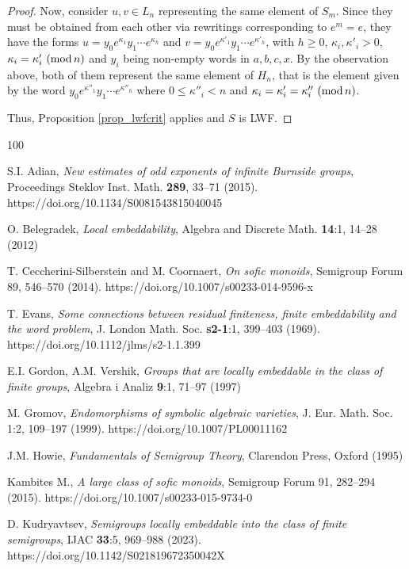 \documentclass{article}
\theoremstyle{definition}
\def\mod{{\rm mod}\,}
\begin{document}
\begin{proof}
Now, consider $u,v \in L_n$ representing the same element of $S_m$. Since they must be obtained from each other via rewritings corresponding to $e^m = e$, they have the forms $u = y_0 e^{\kappa_1} y_1 \cdots e^{\kappa_h}$ and $v = y_0 e^{\kappa'_1} y_1 \cdots e^{\kappa'_h}$, with $h \ge 0$, $\kappa_i, \kappa'_i >0$, $\kappa_i = \kappa'_i \ (\mod n)$ and $y_i$ being non-empty words in $a,b,c,x$. By the observation above, both of them represent the same element of $H_n$, that is the element given by the word $y_0 e^{\kappa''_1} y_1 \cdots e^{\kappa''_h}$ where $0 \le \kappa''_i <n$ and $\kappa_i = \kappa'_i = \kappa''_i \ (\mod n)$.

Thus, Proposition \ref{prop_lwfcrit} applies and $S$ is LWF.
\end{proof}

\begin{thebibliography}{100}

 S.I. Adian, {\em New estimates of odd exponents of infinite Burnside groups}, Proceedings Steklov Inst. Math. {\bf 289}, 33--71 (2015). https://doi.org/10.1134/S0081543815040045

 O. Belegradek, {\em Local embeddability}, Algebra and Discrete Math. {\bf 14}:1, 14--28 (2012)

 T. Ceccherini-Silberstein and M. Coornaert, {\em On sofic monoids}, Semigroup Forum 89, 546--570 (2014). https://doi.org/10.1007/s00233-014-9596-x

 T. Evans, {\em Some connections between residual finiteness, finite embeddability and the word problem}, J. London Math. Soc. {\bf s2-1}:1, 399--403 (1969). https://doi.org/10.1112/jlms/s2-1.1.399

 E.I. Gordon, A.M. Vershik, {\em Groups that are locally embeddable in the class of finite groups}, Algebra i Analiz {\bf 9}:1, 71--97 (1997)

 M. Gromov, {\em Endomorphisms of symbolic algebraic varieties}, J. Eur. Math. Soc. 1:2, 109--197 (1999). https://doi.org/10.1007/PL00011162

 J.M. Howie, {\em Fundamentals of Semigroup Theory}, Clarendon Press, Oxford (1995)

 Kambites M., {\em A large class of sofic monoids}, Semigroup Forum 91, 282--294 (2015). https://doi.org/10.1007/s00233-015-9734-0

 D. Kudryavtsev, {\em Semigroups locally embeddable into the class of finite semigroups}, IJAC {\bf 33}:5, 969--988 (2023). https://doi.org/10.1142/S021819672350042X


\end{thebibliography}
\end{document}
